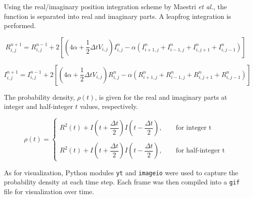 \documentclass{article}
\begin{document}
Using the real/imaginary position integration scheme by Maestri \textit{et al.}, the function is separated into real and imaginary parts. A leapfrog integration is performed. 

$$R_{i, j}^{n + 1} = R_{i, j}^{n - 1} + 2\left[(4\alpha + \dfrac{1}{2}\Delta tV_{i,j})I_{i, j}^{n} - \alpha(I_{i + 1, j}^{n} + I_{i - 1, j}^{n} + I_{i, j + 1}^{n} + I_{i, j - 1}^{n})\right]$$

$$I_{i, j}^{n + 1} = I_{i, j}^{n - 1} + 2\left[(4\alpha + \dfrac{1}{2}\Delta tV_{i,j})R_{i, j}^{n} - \alpha(R_{i + 1, j}^{n} + R_{i - 1, j}^{n} + R_{i, j + 1}^{n} + R_{i, j - 1}^{n})\right]$$

\noindent The probability density, $\rho(t)$, is given for the real and imaginary parts at integer and half-integer $t$ values, respectively. 



\[ \rho(t) =
\begin{cases} 
	R^{2}(t) + I\left(t + \dfrac{\Delta t}{2}\right)I\left(t - \dfrac{\Delta t}{2}\right),\qquad \text{for integer t} \\	 \\	R^{2}(t) + I\left(t + \dfrac{\Delta t}{2}\right)I\left(t - \dfrac{\Delta t}{2}\right),\qquad \text{for half-integer t}
	\end{cases}
\]		

\noindent As for visualization, Python modules \texttt{yt} and \texttt{imageio} were used to capture the probability density at each time step. Each frame was then compiled into a \texttt{gif} file for visualization over time.
\end{document}
